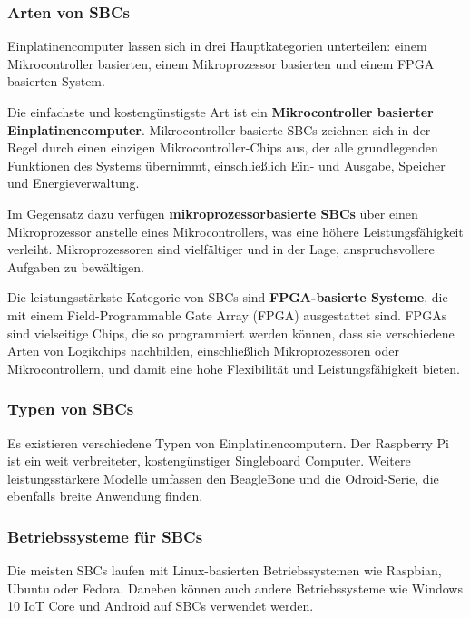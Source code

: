\subsubsection{Arten von SBCs}
Einplatinencomputer lassen sich in drei Hauptkategorien unterteilen: einem Mikrocontroller basierten, einem Mikroprozessor basierten und einem FPGA basierten System. 

Die einfachste und kostengünstigste Art ist ein \textbf{Mikrocontroller basierter Einplatinencomputer}. Mikrocontroller-basierte SBCs zeichnen sich in der Regel durch einen einzigen Mikrocontroller-Chips aus, der alle grundlegenden Funktionen des Systems übernimmt, einschließlich Ein- und Ausgabe, Speicher und Energieverwaltung. 

Im Gegensatz dazu verfügen \textbf{mikroprozessorbasierte SBCs} über einen Mikroprozessor anstelle eines Mikrocontrollers, was eine höhere Leistungsfähigkeit verleiht. Mikroprozessoren sind vielfältiger und in der Lage, anspruchsvollere Aufgaben zu bewältigen. 

Die leistungsstärkste Kategorie von SBCs sind \textbf{FPGA-basierte Systeme}, die mit einem Field-Programmable Gate Array (FPGA) ausgestattet sind. FPGAs sind vielseitige Chips, die so programmiert werden können, dass sie verschiedene Arten von Logikchips nachbilden, einschließlich Mikroprozessoren oder Mikrocontrollern, und damit eine hohe Flexibilität und Leistungsfähigkeit bieten.

\subsubsection{Typen von SBCs}
Es existieren verschiedene Typen von Einplatinencomputern. Der Raspberry Pi ist ein weit verbreiteter, kostengünstiger Singleboard Computer. Weitere leistungsstärkere Modelle umfassen den BeagleBone und die Odroid-Serie, die ebenfalls breite Anwendung finden.

\subsubsection{Betriebssysteme für SBCs}
Die meisten SBCs laufen mit Linux-basierten Betriebssystemen wie Raspbian, Ubuntu oder Fedora. Daneben können auch andere Betriebssysteme wie Windows 10 IoT Core und Android auf SBCs verwendet werden. \parencite{EinplatinencomputerSBCs}

